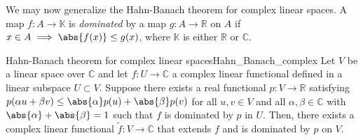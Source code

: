 We may now generalize the Hahn-Banach theorem for complex linear spaces. A map \(f : A \to \mathbb{K}\) is \emph{dominated} by a map \(g : A \to \mathbb{R}\) on \(A\) if \(x \in A \implies \abs{f(x)} \leq g(x)\), where \(\mathbb{K}\) is either \(\mathbb{R}\) or \(\mathbb{C}\).
\begin{theorem}{Hahn-Banach theorem for complex linear spaces}{Hahn_Banach_complex}
    Let \(V\) be a linear space over \(\mathbb{C}\) and let \(f : U \to \mathbb{C}\) a complex linear functional defined in a linear subspace \(U \subset V\). Suppose there exists a real functional \(p : V \to \mathbb{R}\) satisfying \(p(\alpha u + \beta v) \leq \abs{\alpha} p(u) + \abs{\beta} p(v)\) for all \(u,v \in V\) and all \(\alpha,\beta \in \mathbb{C}\) with \(\abs{\alpha} + \abs{\beta} = 1\) such that \(f\) is dominated by \(p\) in \(U\). Then, there exists a complex linear functional \(\tilde{f} : V \to \mathbb{C}\) that extends \(f\) and is dominated by \(p\) on \(V\).
\end{theorem}
